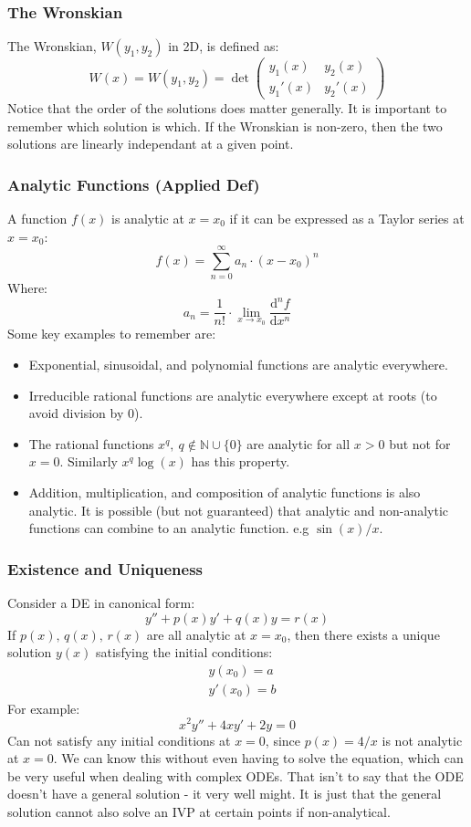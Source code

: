\documentclass[12pt]{article}
\newcommand{\df}[2]{\frac{\text{d}#1}{\text{d}#2}}
\begin{document}
\subsubsection{The Wronskian}
The Wronskian, \(W(y_1,y_2)\) in 2D, is defined as:
\[W(x)=W(y_1,y_2)=\det\begin{pmatrix}
    y_1(x) & y_2(x) \\
    y_1'(x) & y_2'(x)
\end{pmatrix}\]
Notice that the order of the solutions does matter generally. It is important to remember which solution is which. If the Wronskian is non-zero, then the two solutions are linearly independant at a given point.
\subsubsection{Analytic Functions (Applied Def)}
A function \(f(x)\) is analytic at \(x=x_0\) if it can be expressed as a Taylor series at \(x=x_0\):
\[f(x)=\sum^\infty_{n=0}a_n\cdot(x-x_0)^n\]
Where:
\[a_n=\frac{1}{n!}\cdot\lim_{x\to x_0}\df{^nf}{x^n}\]
Some key examples to remember are:
\begin{itemize}
    \item Exponential, sinusoidal, and polynomial functions are analytic everywhere.
    \item Irreducible rational functions are analytic everywhere except at roots (to avoid division by 0).
    \item The rational functions \(x^q,\ q\notin \mathbb{N}\cup \{0\}\) are analytic for all \(x>0\) but not for \(x=0\). Similarly \(x^q\log(x)\) has this property.
    \item Addition, multiplication, and composition of analytic functions is also analytic. It is possible (but not guaranteed) that analytic and non-analytic functions can combine to an analytic function. e.g \(\sin(x)/x\).
\end{itemize}
\subsubsection{Existence and Uniqueness}
Consider a DE in canonical form:
\[y''+p(x)y'+q(x)y=r(x)\]
If \(p(x),\, q(x),\, r(x)\) are all analytic at \(x=x_0\), then there exists a unique solution \(y(x)\) satisfying the initial conditions:
\begin{align*}
    &y(x_0)=a \\
    &y'(x_0)=b
\end{align*}
For example:
\[x^2y''+4xy'+2y=0\]
Can not satisfy any initial conditions at \(x=0\), since \(p(x)=4/x\) is not analytic at \(x=0\). We can know this without even having to solve the equation, which can be very useful when dealing with complex ODEs. That isn't to say that the ODE doesn't have a general solution - it very well might. It is just that the general solution cannot also solve an IVP at certain points if non-analytical.
\end{document}
